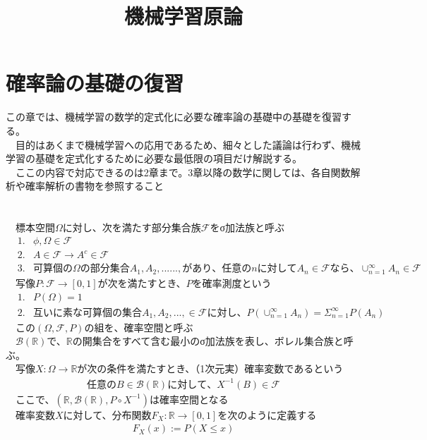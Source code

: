 \documentclass{jsarticle}
\title{機械学習原論}
\author{}
\begin{document}
\maketitle
\section{確率論の基礎の復習}
この章では、機械学習の数学的定式化に必要な確率論の基礎中の基礎を復習する。\\
　目的はあくまで機械学習への応用であるため、細々とした議論は行わず、機械学習の基礎を定式化するために必要な最低限の項目だけ解説する。\\
　ここの内容で対応できるのは2章まで。3章以降の数学に関しては、各自関数解析や確率解析の書物を参照すること　\\
 　\\
\scalebox{1.1}{1.確率空間と確率変数}\\
　標本空間$\Omega$に対し、次を満たす部分集合族$\mathcal{F}$をσ加法族と呼ぶ
\begin{eqnarray}
&1.&\phi,\Omega\in\mathcal{F}\\
&2.&A\in\mathcal{F}\rightarrow A^c\in\mathcal{F}\\
&3.&可算個の\Omega の部分集合 A_1,A_2,......,があり、任意のnに対してA_n\in\mathcal{F}なら、\cup^\infty_{n=1} A_n\in\mathcal{F}
\end{eqnarray}
　写像$P:\mathcal{F}\rightarrow[0,1]$が次を満たすとき、$P$を確率測度という
\begin{eqnarray}
&1.&P(\Omega)=1\\
&2.&互いに素な可算個の集合A_1,A_2,...,\in\mathcal{F}に対し、P(\cup^\infty_{n=1}A_n)=\Sigma^\infty_{n=1}P(A_n)
\end{eqnarray}
　この$(\Omega,\mathcal{F},P)$の組を、確率空間と呼ぶ\\
　$\mathcal{B}(\mathbb{R})$で、$\mathbb{R}$の開集合をすべて含む最小のσ加法族を表し、ボレル集合族と呼ぶ。\\
　写像$X:\Omega\rightarrow\mathbb{R}$が次の条件を満たすとき、（1次元実）確率変数であるという
\begin{eqnarray}
任意のB\in\mathcal{B}(\mathbb{R})に対して、X^{-1}(B)\in\mathcal{F}
\end{eqnarray}
　ここで、$(\mathbb{R},\mathcal{B}(\mathbb{R}),P\circ X^{-1})$は確率空間となる\\
　確率変数$X$に対して、分布関数$F_X:\mathbb{R}\rightarrow[0,1]$を次のように定義する
\begin{eqnarray}
F_X(x):=P(X\leq x)
\end{eqnarray}
\end{document}
